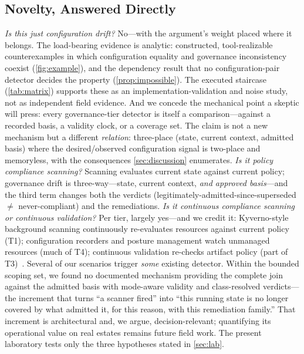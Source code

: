 \subsection{Novelty, Answered Directly}
\emph{Is this just configuration drift?} No---with the argument's weight
placed where it belongs. The load-bearing evidence is analytic: constructed,
tool-realizable counterexamples in which configuration equality and
governance inconsistency coexist (\cref{fig:example}), and the dependency
result that no configuration-pair detector decides the property
(\cref{prop:impossible}). The executed staircase (\cref{tab:matrix})
supports these as an implementation-validation and noise study, not as
independent field evidence. And we concede the mechanical point a skeptic
will press: every governance-tier detector is itself a comparison---against
a recorded basis, a validity clock, or a coverage set. The claim is not a
new mechanism but a different \emph{relation}: three-place
(state, current context, admitted basis) where the desired/observed
configuration signal is two-place and memoryless, with the consequences \cref{sec:discussion}
enumerates. \emph{Is it policy compliance scanning?} Scanning
evaluates current state against current policy; governance drift is
three-way---state, current context, \emph{and approved basis}---and the third
term changes both the verdicts (legitimately-admitted-since-superseded
$\ne$ never-compliant) and the remediations. \emph{Is it continuous compliance scanning or continuous validation?}
Per tier, largely yes---and we credit it: Kyverno-style background scanning
continuously re-evaluates resources against current policy (T1);
configuration recorders and posture management watch unmanaged resources
(much of T4); continuous validation re-checks artifact policy (part of
T3)~\cite{kyverno,awsconfig,cspm,binauthz}. Several of our scenarios
trigger \emph{some} existing detector. Within the bounded scoping set, we
found no documented mechanism providing the complete join against the
admitted basis with mode-aware validity and
class-resolved verdicts---the increment that turns ``a scanner fired'' into
``this running state is no longer covered by what admitted it, for this
reason, with this remediation family.'' That increment is architectural and,
we argue, decision-relevant; quantifying its operational value on real
estates remains future field work. The present laboratory tests only the
three hypotheses stated in \cref{sec:lab}.
